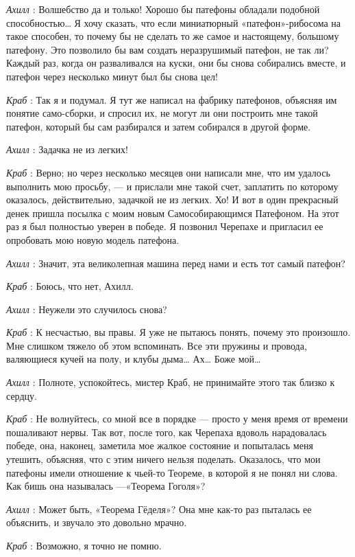 \emph{Ахилл} : Волшебство да и только! Хорошо бы патефоны обладали подобной способностью\ldots{} Я хочу сказать, что если миниатюрный «патефон»-рибосома на такое способен, то почему бы не сделать то же самое и настоящему, большому патефону. Это позволило бы вам создать неразрушимый патефон, не так ли? Каждый раз, когда он разваливался на куски, они бы снова собирались вместе, и патефон через несколько минут был бы снова цел!

\emph{Краб} : Так я и подумал. Я тут же написал на фабрику патефонов, объясняя им понятие само-сборки, и спросил их, не могут ли они построить мне такой патефон, который бы сам разбирался и затем собирался в другой форме.

\emph{Ахилл} : Задачка не из легких!

\emph{Краб} : Верно; но через несколько месяцев они написали мне, что им удалось выполнить мою просьбу, --- и прислали мне такой счет, заплатить по которому оказалось, действительно, задачкой не из легких. Хо! И вот в один прекрасный денек пришла посылка с моим новым Самособирающимся Патефоном. На этот раз я был полностью уверен в победе. Я позвонил Черепахе и пригласил ее опробовать мою новую модель патефона.

\emph{Ахилл} : Значит, эта великолепная машина перед нами и есть тот самый патефон?

\emph{Краб} : Боюсь, что нет, Ахилл.

\emph{Ахилл} : Неужели это случилось снова?

\emph{Краб} : К несчастью, вы правы. Я уже не пытаюсь понять, почему это произошло. Мне слишком тяжело об этом вспоминать. Все эти пружины и провода, валяющиеся кучей на полу, и клубы дыма\ldots{} Ах\ldots{} Боже мой\ldots{}

\emph{Ахилл} : Полноте, успокойтесь, мистер Краб, не принимайте этого так близко к сердцу.

\emph{Краб} : Не волнуйтесь, со мной все в порядке --- просто у меня время от времени пошаливают нервы. Так вот, после того, как Черепаха вдоволь нарадовалась победе, она, наконец, заметила мое жалкое состояние и попыталась меня утешить, объясняя, что с этим ничего нельзя поделать. Оказалось, что мои патефоны имели отношение к чьей-то Теореме, в которой я не понял ни слова. Как бишь она называлась ---«Теорема Гоголя»?

\emph{Ахилл} : Может быть, «Теорема Гёделя»? Она мне как-то раз пыталась ее объяснить, и звучало это довольно мрачно.

\emph{Краб} : Возможно, я точно не помню.

